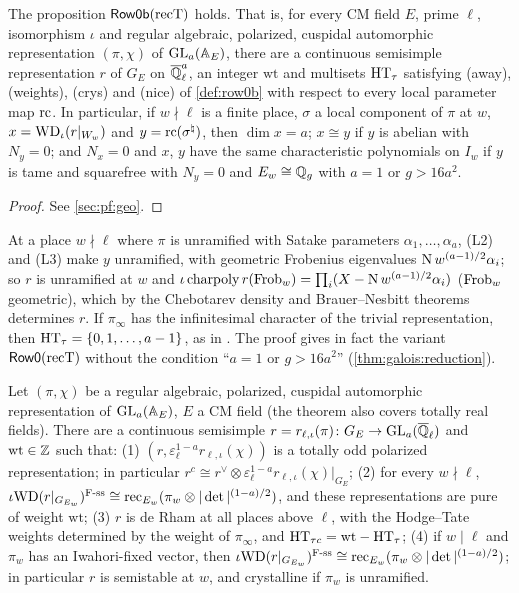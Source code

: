 \begin{theorem}\Fmark\label{thm:row0b}
The proposition $\mathsf{Row0b}(\mathrm{recT})$ holds. That is, for every CM field $E$, prime $\ell$,
isomorphism $\iota$ and regular algebraic, polarized, cuspidal automorphic representation $(\pi,\chi)$ of
$\operatorname{GL}_a(\mathbb{A}_E)$, there are a continuous semisimple representation $r$ of $G_E$ on $\overline{\mathbb{Q}}_\ell^a$, an integer
$\mathrm{wt}$ and multisets $\mathrm{HT}_\tau$ satisfying (away), (weights), (crys) and (nice) of
\cref{def:row0b} with respect to every local parameter map $\mathrm{rc}$. In particular, if $w\nmid\ell$
is a finite place, $\sigma$ a local component of $\pi$ at $w$, $x=\mathrm{WD}_\iota(r|_{W_w})$ and
$y=\mathrm{rc}(\sigma^\natural)$, then $\dim x=a$; $x\cong y$ if $y$ is abelian with $N_y=0$; and $N_x=0$
and $x$, $y$ have the same characteristic polynomials on $I_w$ if $y$ is tame and squarefree with
$N_y=0$ and $E_w\cong\mathbb{Q}_g$ with $a=1$ or $g>16a^2$.
\end{theorem}
\begin{proof}See \cref{sec:pf:geo}.
\end{proof}


At a place $w\nmid\ell$ where $\pi$ is unramified with Satake parameters $\alpha_1,\dots,\alpha_a$,
(L2) and (L3) make $y$ unramified, with geometric Frobenius eigenvalues $\operatorname{N} w^{(a-1)/2}\alpha_i$; so
$r$ is unramified at $w$ and $\iota\,\mathrm{charpoly}\,r(\operatorname{Frob}_w)=\prod_i(X-\operatorname{N} w^{(a-1)/2}\alpha_i)$
($\operatorname{Frob}_w$ geometric), which by the Chebotarev density and Brauer--Nesbitt theorems determines $r$. If
$\pi_\infty$ has the infinitesimal character of the trivial representation, then
$\mathrm{HT}_\tau=\{0,1,\dots,a-1\}$, as in \cite{BarnetLambEtAl2014}. The proof gives in fact the variant
$\mathsf{Row0}(\mathrm{recT})$ without the condition ``$a=1$ or $g>16a^2$'' (\cref{thm:galois:reduction}).

\begin{littheorem}\label{thm:galois:blggt}
Let $(\pi,\chi)$ be a regular algebraic, polarized, cuspidal automorphic representation of
$\operatorname{GL}_a(\mathbb{A}_E)$, $E$ a CM field (the theorem also covers totally real fields). There are a continuous
semisimple $r=r_{\ell,\iota}(\pi)\colon G_E\to\operatorname{GL}_a(\overline{\mathbb{Q}}_\ell)$ and $\mathrm{wt}\in\mathbb{Z}$ such that:
(1) $(r,\varepsilon_\ell^{1-a}r_{\ell,\iota}(\chi))$ is a totally odd polarized representation; in
particular $r^c\cong r^\vee\otimes\varepsilon_\ell^{1-a}r_{\ell,\iota}(\chi)|_{G_E}$;
(2) for every $w\nmid\ell$, $\iota\mathrm{WD}(r|_{G_{E_w}})^{\mathrm{F\text{-}ss}}\cong
\mathrm{rec}_{E_w}(\pi_w\otimes|\det|^{(1-a)/2})$, and these representations are pure of weight
$\mathrm{wt}$;
(3) $r$ is de Rham at all places above $\ell$, with the Hodge--Tate weights determined by the weight
of $\pi_\infty$, and $\mathrm{HT}_{\tau c}=\mathrm{wt}-\mathrm{HT}_\tau$;
(4) if $w\mid\ell$ and $\pi_w$ has an Iwahori-fixed vector, then
$\iota\mathrm{WD}(r|_{G_{E_w}})^{\mathrm{F\text{-}ss}}\cong\mathrm{rec}_{E_w}(\pi_w\otimes|\det|^{(1-a)/2})$;
in particular $r$ is semistable at $w$, and crystalline if $\pi_w$ is unramified.
\end{littheorem}

